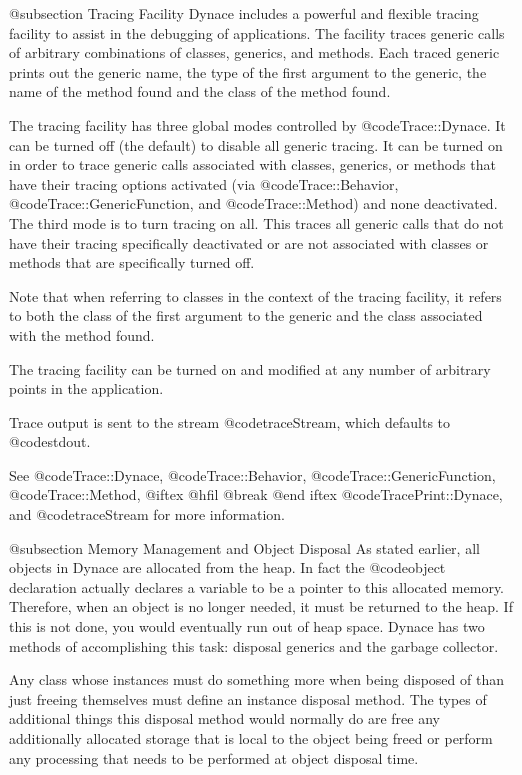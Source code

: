 @subsection Tracing Facility
Dynace includes a powerful and flexible tracing facility to assist
in the debugging of applications.  The facility traces generic calls
of arbitrary combinations of classes, generics, and methods.
Each traced generic prints out the generic name, the type of the first
argument to the generic, the name of the method found and the class
of the method found.

The tracing facility has three global modes controlled by
@code{Trace::Dynace}.  It can be turned off (the default)
to disable all generic tracing.  It can be turned on in order to
trace generic calls associated with classes, generics, or methods
that have their tracing options activated (via @code{Trace::Behavior},
@code{Trace::GenericFunction}, and @code{Trace::Method}) and none
deactivated.  The third mode is to turn tracing on all.  This traces
all generic calls that do not have their tracing specifically
deactivated or are not associated with classes or methods that
are specifically turned off.

Note that when referring to classes in the context of the tracing
facility, it refers to both the class of the first argument to
the generic and the class associated with the method found.

The tracing facility can be turned on and modified at any number of
arbitrary points in the application.

Trace output is sent to the stream @code{traceStream}, which defaults
to @code{stdout}.

See @code{Trace::Dynace}, @code{Trace::Behavior},
@code{Trace::GenericFunction}, @code{Trace::Method},
@iftex 
@hfil @break 
@end iftex
@code{TracePrint::Dynace}, and @code{traceStream} for more information.




@subsection Memory Management and Object Disposal
As stated earlier, all objects in Dynace are allocated from the heap.  In
fact the @code{object} declaration actually declares a variable to be a
pointer to this allocated memory.  Therefore, when an object is no
longer needed, it must be returned to the heap.  If this is not done, you
would eventually run out of heap space.  Dynace has two methods of
accomplishing this task: disposal generics and the garbage collector.

Any class whose instances must do something more when
being disposed of than just freeing themselves must define an instance
disposal method.  The types of additional things this disposal method
would normally do are free any additionally allocated storage that is
local to the object being freed or perform any processing that needs
to be performed at object disposal time.

